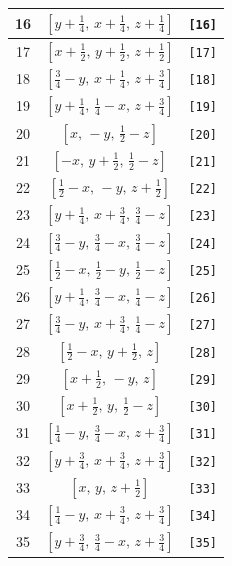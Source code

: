 \documentclass[fleqn,8pt]{jsarticle}
\begin{document}
\begin{longtable}{ccc}
16 & $\left[ y + \frac{1}{4},\, x + \frac{1}{4},\, z + \frac{1}{4} \right]$ & {\tt [16]} \\ \hline
17 & $\left[ x + \frac{1}{2},\, y + \frac{1}{2},\, z + \frac{1}{2} \right]$ & {\tt [17]} \\ \hline
18 & $\left[ \frac{3}{4} - y,\, x + \frac{1}{4},\, z + \frac{3}{4} \right]$ & {\tt [18]} \\ \hline
19 & $\left[ y + \frac{1}{4},\, \frac{1}{4} - x,\, z + \frac{3}{4} \right]$ & {\tt [19]} \\ \hline
20 & $\left[ x,\, - y,\, \frac{1}{2} - z \right]$ & {\tt [20]} \\ \hline
21 & $\left[ - x,\, y + \frac{1}{2},\, \frac{1}{2} - z \right]$ & {\tt [21]} \\ \hline
22 & $\left[ \frac{1}{2} - x,\, - y,\, z + \frac{1}{2} \right]$ & {\tt [22]} \\ \hline
23 & $\left[ y + \frac{1}{4},\, x + \frac{3}{4},\, \frac{3}{4} - z \right]$ & {\tt [23]} \\ \hline
24 & $\left[ \frac{3}{4} - y,\, \frac{3}{4} - x,\, \frac{3}{4} - z \right]$ & {\tt [24]} \\ \hline
25 & $\left[ \frac{1}{2} - x,\, \frac{1}{2} - y,\, \frac{1}{2} - z \right]$ & {\tt [25]} \\ \hline
26 & $\left[ y + \frac{1}{4},\, \frac{3}{4} - x,\, \frac{1}{4} - z \right]$ & {\tt [26]} \\ \hline
27 & $\left[ \frac{3}{4} - y,\, x + \frac{3}{4},\, \frac{1}{4} - z \right]$ & {\tt [27]} \\ \hline
28 & $\left[ \frac{1}{2} - x,\, y + \frac{1}{2},\, z \right]$ & {\tt [28]} \\ \hline
29 & $\left[ x + \frac{1}{2},\, - y,\, z \right]$ & {\tt [29]} \\ \hline
30 & $\left[ x + \frac{1}{2},\, y,\, \frac{1}{2} - z \right]$ & {\tt [30]} \\ \hline
31 & $\left[ \frac{1}{4} - y,\, \frac{3}{4} - x,\, z + \frac{3}{4} \right]$ & {\tt [31]} \\ \hline
32 & $\left[ y + \frac{3}{4},\, x + \frac{3}{4},\, z + \frac{3}{4} \right]$ & {\tt [32]} \\ \hline
33 & $\left[ x,\, y,\, z + \frac{1}{2} \right]$ & {\tt [33]} \\ \hline
34 & $\left[ \frac{1}{4} - y,\, x + \frac{3}{4},\, z + \frac{3}{4} \right]$ & {\tt [34]} \\ \hline
35 & $\left[ y + \frac{3}{4},\, \frac{3}{4} - x,\, z + \frac{3}{4} \right]$ & {\tt [35]} \\ \hline

\end{longtable}
\end{document}
